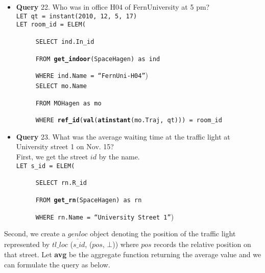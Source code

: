\begin{itemize}
 \item \textbf{Query} 22. Who was in office H04 of FernUniversity at 5 pm?\\

\texttt{LET qt = instant(2010, 12, 5, 17)}   \\

\texttt{LET room\_id = ELEM(}

$\hspace{1cm}$ \texttt{SELECT ind.In\_id}

$\hspace{1cm}$ \texttt{FROM \textbf{get\_indoor}(SpaceHagen) as ind}

$\hspace{1cm}$ \texttt{WHERE ind.Name = ``FernUni-H04''}) \\


$\hspace{1cm}$ \texttt{SELECT mo.Name}

$\hspace{1cm}$ \texttt{FROM MOHagen as mo}

$\hspace{1cm}$ \texttt{WHERE \textbf{ref\_id}(\textbf{val}(\textbf{atinstant}(mo.Traj, qt))) = room\_id}  \\

\end{itemize}

\begin{itemize}
 \item \textbf{Query} 23. What was the average waiting time at the traffic light at University street 1 on Nov. 15? \\

First, we get the street $id$ by the name. \\

\texttt{LET s\_id = ELEM(}

$\hspace{1cm}$ \texttt{SELECT rn.R\_id}

$\hspace{1cm}$ \texttt{FROM \textbf{get\_rn}(SpaceHagen) as rn}

$\hspace{1cm}$ \texttt{WHERE rn.Name = ``University Street 1''}) \\

\end{itemize}

Second, we create a $\underline{genloc}$ object denoting the position of the traffic light 
represented by $tl\_loc$ ($s\_id$, ($pos$, $\bot$)) where $pos$ records the relative position on that street. Let \textbf{avg} be the aggregate function returning the average value and we can formulate the query as below. \\

